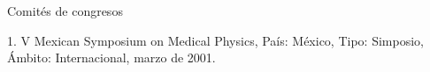 Comités de congresos

1. V Mexican Symposium on Medical Physics, País: México, Tipo: Simposio, Ámbito: Internacional, 
marzo de 2001.


